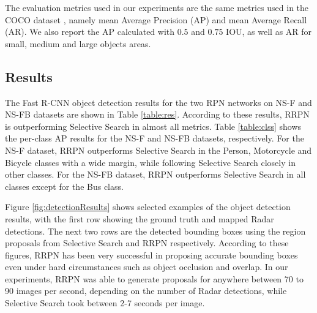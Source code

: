 \documentclass{article}
\newcommand{\datasetF}{NS-F }
\newcommand{\datasetFB}{NS-FB }
\begin{document}
The evaluation metrics used in our experiments are the same metrics used in 
the COCO dataset \cite{Lin_2014}, namely 
mean Average Precision (AP) and mean Average Recall (AR). 
We also report the AP calculated 
with $0.5$ and $0.75$ IOU, as well as AR for small, medium and large objects areas.
\subsection{Results}
The Fast R-CNN object detection results for the two RPN networks on \datasetF and 
\datasetFB datasets are shown in Table \ref{table:res}. 
According to these results, RRPN is outperforming Selective Search in almost all metrics.
Table \ref{table:clss} shows the per-class AP results for the 
\datasetF and \datasetFB datasets, respectively. For the \datasetF dataset, RRPN outperforms 
Selective Search in the Person, Motorcycle and Bicycle classes with a wide margin, while 
following Selective Search closely in other classes. For the \datasetFB dataset, RRPN 
outperforms Selective Search in all classes except for the Bus class.

Figure \ref{fig:detectionResults} shows selected examples of the object detection results, with the first row showing the ground truth and mapped Radar detections. The next two rows are the detected bounding boxes using the region proposals from 
Selective Search and RRPN respectively. According to these figures, RRPN has been very 
successful in proposing accurate bounding boxes even under hard circumstances such as 
object occlusion and overlap.
In our experiments, RRPN was able to generate proposals for anywhere between 70 to 90 
images per second, depending on the number of Radar detections, while Selective Search took between 2-7 seconds per image.
\end{document}
